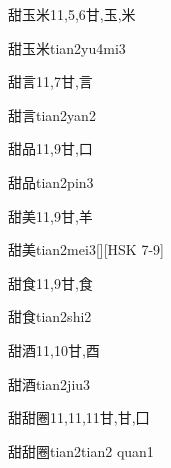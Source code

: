 \begin{Entry}{甜玉米}{11,5,6}{⽢,⽟,⽶}
  \begin{Phonetics}{甜玉米}{tian2yu4mi3}
  \end{Phonetics}
\end{Entry}

\begin{Entry}{甜言}{11,7}{⽢,⾔}
  \begin{Phonetics}{甜言}{tian2yan2}
  \end{Phonetics}
\end{Entry}

\begin{Entry}{甜品}{11,9}{⽢,⼝}
  \begin{Phonetics}{甜品}{tian2pin3}
  \end{Phonetics}
\end{Entry}

\begin{Entry}{甜美}{11,9}{⽢,⽺}
  \begin{Phonetics}{甜美}{tian2mei3}[][HSK 7-9]
  \end{Phonetics}
\end{Entry}

\begin{Entry}{甜食}{11,9}{⽢,⾷}
  \begin{Phonetics}{甜食}{tian2shi2}
  \end{Phonetics}
\end{Entry}

\begin{Entry}{甜酒}{11,10}{⽢,⾣}
  \begin{Phonetics}{甜酒}{tian2jiu3}
  \end{Phonetics}
\end{Entry}

\begin{Entry}{甜甜圈}{11,11,11}{⽢,⽢,⼞}
  \begin{Phonetics}{甜甜圈}{tian2tian2 quan1}
  \end{Phonetics}
\end{Entry}

